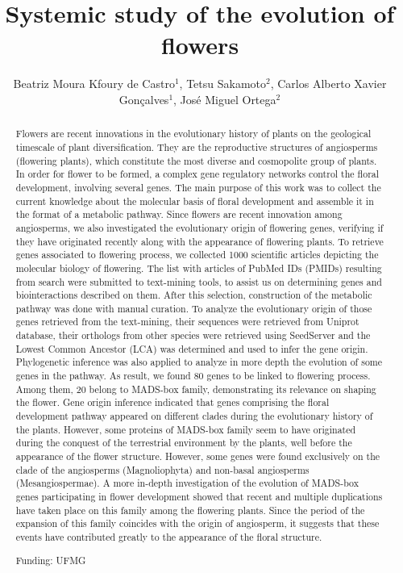 \documentclass[twoside]{article}
\title{\vspace{-15mm}\fontsize{24pt}{10pt}\selectfont\textbf{Systemic study of the evolution of flowers}} %
\author{Beatriz Moura Kfoury de Castro$^1$, Tetsu Sakamoto$^2$, Carlos Alberto Xavier Gon\c{c}alves$^1$, Jos\'e Miguel Ortega$^2$}
\affil{1 UFMG\\ 2 UFMG, LABORAT\'ORIO DE BIODADOS\\ }
\date{}
\begin{document}
\maketitle %

\thispagestyle{fancy} %


\begin{abstract}
Flowers are recent innovations in the evolutionary history of plants on the geological timescale of plant diversification. They are the reproductive structures of angiosperms (flowering plants), which constitute the most diverse and cosmopolite group of plants. In order for flower to be formed, a complex gene regulatory networks control the floral development, involving several genes. The main purpose of this work was to collect the current knowledge about the molecular basis of floral development and assemble it in the format of a metabolic pathway. Since flowers are recent innovation among angiosperms, we also investigated the evolutionary origin of flowering genes, verifying if they have originated recently along with the appearance of flowering plants. To retrieve genes associated to flowering process, we collected 1000 scientific articles depicting the molecular biology of flowering. The list with articles of PubMed IDs (PMIDs) resulting from search were submitted to text-mining tools, to assist us on determining genes and biointeractions described on them. After this selection, construction of the metabolic pathway was done with manual curation. To analyze the evolutionary origin of those genes retrieved from the text-mining, their sequences were retrieved from Uniprot database, their orthologs from other species were retrieved using SeedServer and the Lowest Common Ancestor (LCA) was determined and used to infer the gene origin. Phylogenetic inference was also applied to analyze in more depth the evolution of some genes in the pathway. As result, we found 80 genes to be linked to flowering process. Among them, 20 belong to MADS-box family, demonstrating its relevance on shaping the flower. Gene origin inference indicated that genes comprising the floral development pathway appeared on different clades during the evolutionary history of the plants. However, some proteins of MADS-box family seem to have originated during the conquest of the terrestrial environment by the plants, well before the appearance of the flower structure. However, some genes were found exclusively on the clade of the angiosperms (Magnoliophyta) and non-basal angiosperms (Mesangiospermae). A more in-depth investigation of the evolution of MADS-box genes participating in flower development showed that recent and multiple duplications have taken place on this family among the flowering plants. Since the period of the expansion of this family coincides with the origin of angiosperm, it suggests that these events have contributed greatly to the appearance of the floral structure.

Funding: UFMG
\end{abstract}
\end{document}
